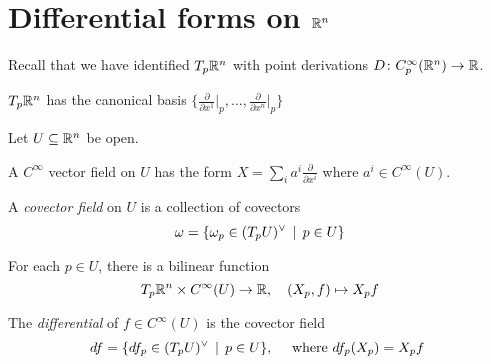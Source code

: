 \section{Differential forms on \texorpdfstring{$\mathbb R^n$}  \phantom{s}}
\begin{frame}
  Recall that we have identified $T_p\mathbb R^n$ with
  point derivations $D \colon C^{\infty}_p(\mathbb R^n) \to \mathbb R$.

  $T_p \mathbb R^n$ has the canonical basis
  $\{
    \frac{\partial}{\partial x^1}\vert_p
    , \dots, 
    \frac{\partial}{\partial x^n}\vert_p
  \}$

  Let $U \subseteq \mathbb R^n$ be open. 

  A $C^{\infty}$ vector field on $U$ has the form $X = \sum_i a^i 
  \frac{\partial}{\partial x^i}$ where $a^i \in C^{\infty}(U)$.
  \begin{defn}
    A {\em covector field} on $U$ is a collection of covectors
    \begin{displaymath}
      \omega = \{ \omega_p \in (T_p U)^\vee \, \mid \, p \in U \}
    \end{displaymath}
  \end{defn}
  For each $p \in U$, there is a bilinear function
  \begin{displaymath}
    T_p \mathbb R^n \times C^{\infty}(U) \to \mathbb R, \quad (X_p, f) \mapsto X_p f
  \end{displaymath}
  \begin{defn}
    The {\em differential} of $f \in C^{\infty}(U)$ is the covector field
    \begin{displaymath}
      df = \{df_p \in (T_pU)^\vee \, \mid \, p \in U\}, \quad \text{
        where $df_p(X_p) = X_p f$
      }
    \end{displaymath}
  \end{defn}
\end{frame}
